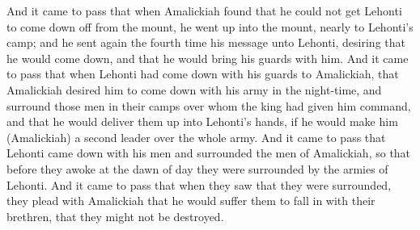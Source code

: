 \bverse \iffalse And it came to pass that when Amalickiah found that he could not get Lehonti to come down off from the mount, he went up into the mount, nearly to Lehonti's camp; and he sent again the fourth time his message unto Lehonti, desiring that he would come down, and that he would bring his guards with him. \fi
And it came to pass that when Amalickiah found that he could not get Lehonti to come down off from the mount, he went up into the mount, nearly to Lehonti's camp; and he sent again the fourth time his message unto Lehonti, desiring that he would come down, and that he would bring his guards with him.
\bverse \iffalse And it came to pass that when Lehonti had come down with his guards to Amalickiah, that Amalickiah desired him to come down with his army in the night-time, and surround those men in their camps over whom the king had given him command, and that he would deliver them up into Lehonti's hands, if he would make him (Amalickiah) a second leader over the whole army. \fi
And it came to pass that when Lehonti had come down with his guards to Amalickiah, that Amalickiah desired him to come down with his army in the night-time, and surround those men in their camps over whom the king had given him command, and that he would deliver them up into Lehonti's hands, if he would make him (Amalickiah) a second leader over the whole army.
\bverse \iffalse And it came to pass that Lehonti came down with his men and surrounded the men of Amalickiah, so that before they awoke at the dawn of day they were surrounded by the armies of Lehonti. \fi
And it came to pass that Lehonti came down with his men and surrounded the men of Amalickiah, so that before they awoke at the dawn of day they were surrounded by the armies of Lehonti.
\bverse \iffalse And it came to pass that when they saw that they were surrounded, they plead with Amalickiah that he would suffer them to fall in with their brethren, that they might not be destroyed. \fi
And it came to pass that when they saw that they were surrounded, they plead with Amalickiah that he would suffer them to fall in with their brethren, that they might not be destroyed.

